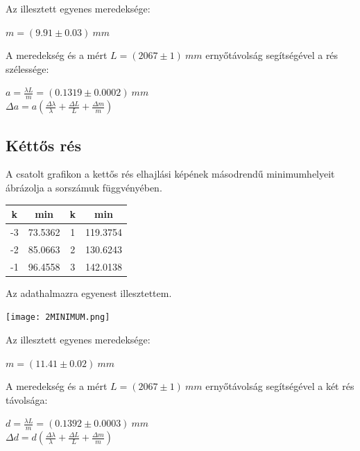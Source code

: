\documentclass[a4paper,11pt]{article}
\begin{document}
Az illesztett egyenes meredeksége:
\begin{center}
$m=(9.91\pm0.03)~mm$
\end{center}

A meredekség és a mért $L=(2067\pm1)~mm$ ernyőtávolság segítségével a rés szélessége:
\begin{center}
$a=\frac{\lambda L}{m}=(0.1319\pm0.0002)~mm$
\\
$\Delta a=a(\frac{\Delta \lambda}{\lambda}+\frac{\Delta L}{L}+\frac{\Delta m}{m})$
\end{center}

\subsection{Kéttős rés}

A csatolt grafikon a kettős rés elhajlási képének másodrendű minimumhelyeit ábrázolja a sorszámuk függvényében.
\begin{center}
\begin{tabular}{|c|c|c|c|} \hline
k & min & k & min \\ \hline
-3 & 73.5362 & 1 & 119.3754 \\ \hline
-2 & 85.0663 & 2 & 130.6243 \\ \hline
-1 & 96.4558 & 3 & 142.0138 \\ \hline
\end{tabular}
\end{center}
Az adathalmazra egyenest illesztettem.
\begin{center}
\texttt{[image: 2MINIMUM.png]}
\end{center}
Az illesztett egyenes meredeksége:
\begin{center}
$m=(11.41\pm0.02)~mm$
\end{center}
A meredekség és a mért $L=(2067\pm1)~mm$ ernyőtávolság segítségével a két rés távolsága:
\begin{center}
$d=\frac{\lambda L}{m}=(0.1392\pm0.0003)~mm$
\\
$\Delta d=d(\frac{\Delta \lambda}{\lambda}+\frac{\Delta L}{L}+\frac{\Delta m}{m})$
\end{center}
\end{document}
